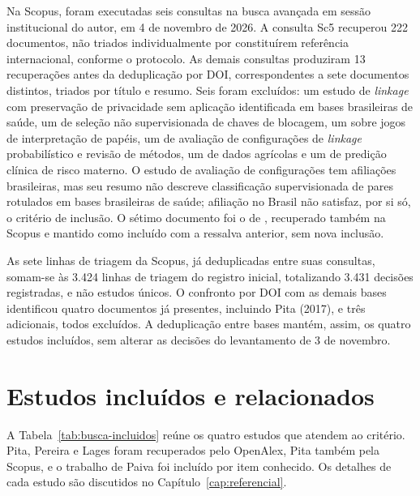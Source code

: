 Na Scopus, foram executadas seis consultas na busca avançada em sessão institucional do autor, em 4 de novembro de 2026. A consulta Sc5 recuperou 222 documentos, não triados individualmente por constituírem referência internacional, conforme o protocolo. As demais consultas produziram 13 recuperações antes da deduplicação por DOI, correspondentes a sete documentos distintos, triados por título e resumo. Seis foram excluídos: um estudo de \textit{linkage} com preservação de privacidade sem aplicação identificada em bases brasileiras de saúde, um de seleção não supervisionada de chaves de blocagem, um sobre jogos de interpretação de papéis, um de avaliação de configurações de \textit{linkage} probabilístico e revisão de métodos, um de dados agrícolas e um de predição clínica de risco materno. O estudo de avaliação de configurações tem afiliações brasileiras, mas seu resumo não descreve classificação supervisionada de pares rotulados em bases brasileiras de saúde; afiliação no Brasil não satisfaz, por si só, o critério de inclusão. O sétimo documento foi o de , recuperado também na Scopus e mantido como incluído com a ressalva anterior, sem nova inclusão.

As sete linhas de triagem da Scopus, já deduplicadas entre suas consultas, somam-se às 3.424 linhas de triagem do registro inicial, totalizando 3.431 decisões registradas, e não estudos únicos. O confronto por DOI com as demais bases identificou quatro documentos já presentes, incluindo Pita (2017), e três adicionais, todos excluídos. A deduplicação entre bases mantém, assim, os quatro estudos incluídos, sem alterar as decisões do levantamento de 3 de novembro.

\section{Estudos incluídos e relacionados}

A Tabela~\ref{tab:busca-incluidos} reúne os quatro estudos que atendem ao critério. Pita, Pereira e Lages foram recuperados pelo OpenAlex, Pita também pela Scopus, e o trabalho de Paiva foi incluído por item conhecido. Os detalhes de cada estudo são discutidos no Capítulo~\ref{cap:referencial}.

